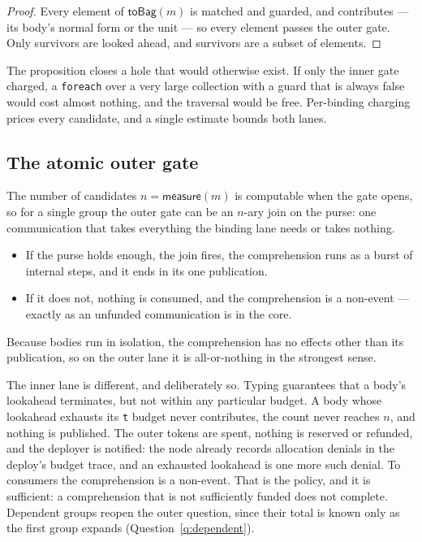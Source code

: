 \documentclass[11pt]{article}
\theoremstyle{branddef}
\theoremstyle{brandplain}
\theoremstyle{brandrem}
\newcommand{\meas}{\mathsf{measure}}
\newcommand{\fe}{\texttt{foreach}}
\begin{document}
\begin{proof}
Every element of \(\mathsf{toBag}(m)\) is matched and guarded, and contributes
--- its body's normal form or the unit --- so every element passes the outer
gate. Only survivors are looked ahead, and survivors are a subset of elements.
\end{proof}

The proposition closes a hole that would otherwise exist. If only the inner
gate charged, a \fe{} over a very large collection with a guard that is always
false would cost almost nothing, and the traversal would be free. Per-binding
charging prices every candidate, and a single estimate bounds both lanes.

\subsection{The atomic outer gate}
\label{sec:atomicgate}

The number of candidates \(n = \meas(m)\) is computable when the gate opens, so
for a single group the outer gate can be an \(n\)-ary join on the purse: one
communication that takes everything the binding lane needs or takes nothing.
\begin{itemize}[nosep]
\item If the purse holds enough, the join fires, the comprehension runs as a
burst of internal steps, and it ends in its one publication.
\item If it does not, nothing is consumed, and the comprehension is a non-event
--- exactly as an unfunded communication is in the core.
\end{itemize}
Because bodies run in isolation, the comprehension has no effects other than
its publication, so on the outer lane it is all-or-nothing in the strongest
sense.

The inner lane is different, and deliberately so. Typing guarantees that a
body's lookahead terminates, but not within any particular budget. A body whose
lookahead exhausts its \texttt{t} budget never contributes, the count never
reaches \(n\), and nothing is published. The outer tokens are spent, nothing is
reserved or refunded, and the deployer is notified: the node already records
allocation denials in the deploy's budget trace, and an exhausted lookahead is
one more such denial. To consumers the comprehension is a non-event. That is
the policy, and it is sufficient: a comprehension that is not sufficiently
funded does not complete. Dependent groups reopen the outer question, since
their total is known only as the first group expands
(Question~\ref{q:dependent}).
\end{document}
